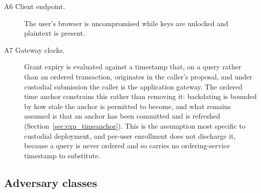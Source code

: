 \documentclass[preprint,12pt]{elsarticle}
\begin{document}
\begin{description}
\item[A6 Client endpoint.] The user's browser is uncompromised while keys are
unlocked and plaintext is present.

\item[A7 Gateway clocks.] Grant expiry is evaluated against a timestamp that,
on a query rather than an ordered transaction, originates in the caller's
proposal, and under custodial submission the caller is the application
gateway. The ordered time anchor constrains this rather than removing it:
backdating is bounded by how stale the anchor is permitted to become, and what
remains assumed is that an anchor has been committed and is refreshed
(Section~\ref{sec:exp_timeanchor}). This is the assumption most specific to
custodial deployment, and per-user enrollment does not discharge it, because a
query is never ordered and so carries no ordering-service timestamp to
substitute.
\end{description}

\subsection{Adversary classes}
\label{sec:adversaries}
\end{document}
